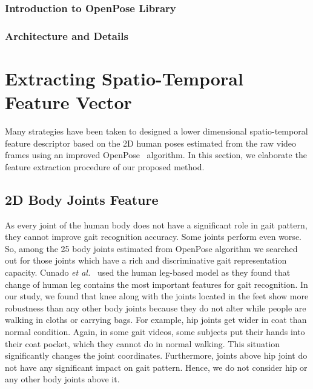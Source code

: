 \subsubsection{Introduction to OpenPose Library} 
\subsubsection{Architecture and Details}



\section{Extracting Spatio-Temporal Feature Vector}
Many strategies have been taken to designed a lower dimensional spatio-temporal feature descriptor based on the 2D human poses estimated from the raw video frames using an improved OpenPose~\cite{Cao_19} algorithm. In this section, we elaborate the feature extraction procedure of our proposed method. 


\subsection{2D Body Joints Feature}
As every joint of the human body does not have a significant role in gait pattern, they cannot improve gait recognition accuracy. Some joints perform even worse. So, among the 25 body joints estimated from OpenPose algorithm we searched out for those joints which have a rich and discriminative gait representation capacity. Cunado \textit{et al.}~\cite{Cunado_97} used the human leg-based model as they found that change of human leg contains the most important features for gait recognition.  In our study, we found that knee along with the joints located in the feet show more robustness than any other body joints because they do not alter while people are walking in cloths or carrying bags. For example, hip joints get wider in coat than normal condition. Again, in some gait videos, some subjects put their hands into their coat pocket, which they cannot do in normal walking. This situation significantly changes the joint coordinates. Furthermore, joints above hip joint do not have any significant impact on gait pattern. Hence, we do not consider hip or any other body joints above it.

